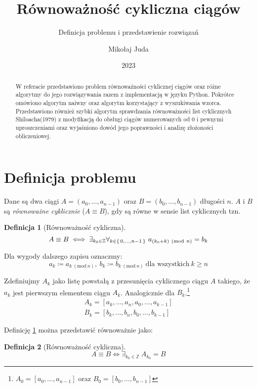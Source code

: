 \documentclass{scrartcl}
\title{Równoważność cykliczna ciągów}
\subtitle{Definicja problemu i przedstawienie rozwiązań}
\date{2023}
\author{Mikołaj Juda}
\newcommand{\Mod}[1]{\ (\mathrm{mod}\ #1)}
\theoremstyle{definition}
\newtheorem{cyclic_equivalence_1}{Definicja}[section]
\newtheorem{cyclic_equivalence_2}
[cyclic_equivalence_1]{Definicja}
\theoremstyle{plain}
\theoremstyle{remark}
\theoremstyle{plain}
\theoremstyle{definition}
\theoremstyle{plain}
\begin{document}
\maketitle
\begin{abstract}
	W referacie przedstawiono
	problem równoważności cyklicznej ciągów
	oraz różne algorytmy do jego rozwiązywania
	razem z implementacją w języku Python.
	Pokrótce omówiono algorytm naiwny
	oraz algorytm korzystający z wyszukiwania wzorca.
	Przedstawiono również
	szybki algorytm sprawdzania równoważności
	list cyklicznych Shiloacha(1979)\cite{shiloach1979}
	z modyfikacją do obsługi ciągów
	numerowanych od \(0\)
	i pewnymi uproszczeniami\cite{wazniakmimuw}
	oraz wyjaśniono dowód jego poprawności
	i analizę złożoności obliczeniowej.
\end{abstract}
\tableofcontents
\pagebreak
\section{Definicja problemu}
Dane są dwa ciągi
\(A=(a_0,\dots,a_{n-1})\) oraz \(B=(b_0,\dots,b_{n-1})\)
długości \(n\).\linebreak
\(A\) i \(B\) są \emph{równoważne cyklicznie}
(\(A\equiv B\)),
gdy są równe w sensie list cyklicznych tzn.
\begin{cyclic_equivalence_1}[Równoważność cykliczna]
	\label{def:cyclic_equivalence_1}
	\[A\equiv B \iff \exists_{k_0\in\mathbb{Z}}
		\forall_{k\in\set{0,\dots,n-1}}\ a_{(k_0+k)\Mod{n}}=b_k\]
\end{cyclic_equivalence_1}

Dla wygody dalszego zapisu oznaczmy:
\[a_k\coloneq a_{k\Mod{n}},\ b_k\coloneq b_{k\Mod{n}}
	\ \text{dla wszystkich}\ k\ge n\]

Zdefiniujmy \(A_k\) jako listę powstałą z przesunięcia cyklicznego
ciągu \(A\) takiego, że \(a_k\) jest
pierwszym elementem ciągu \(A_k\).
Analogicznie dla \(B_k\).\footnote{\(A_0=[a_0,\dots,a_{n-1}]\)
oraz \(B_0=[b_0,\dots,b_{n-1}]\)}
\begin{align*}
	A_k=[a_{k},\dots,a_n,a_0,\dots,a_{k-1}] \\
	B_k=[b_{k},\dots,b_n,b_0,\dots,b_{k-1}]
\end{align*}

Definicję \cref{def:cyclic_equivalence_1} można
przedstawić równoważnie jako:
\begin{cyclic_equivalence_2}[Równoważność cykliczna]
	\[A\equiv B \iff \exists_{k_0\in\mathbb{Z}}
		\ A_{k_0}=B\]
\end{cyclic_equivalence_2}
\end{document}
